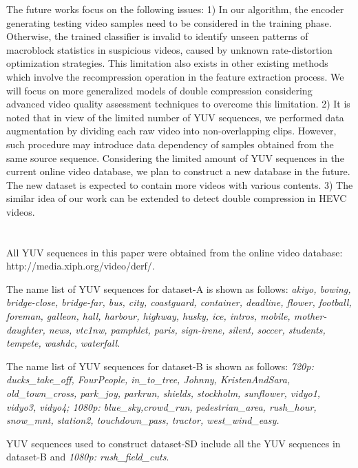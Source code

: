 \documentclass[journal,sort]{IEEEtran}
\begin{document}
The future works focus on the following issues: 1) In our algorithm, the encoder generating testing video samples need to be considered in the training phase. Otherwise, the trained classifier is invalid to identify unseen patterns of macroblock statistics in suspicious videos, caused by unknown rate-distortion optimization strategies. This limitation also exists in other existing methods which involve the recompression operation in the feature extraction process. We will focus on more generalized models of double compression considering advanced video quality assessment techniques to overcome this limitation. 2) It is noted that in view of the limited number of YUV sequences, we performed data augmentation by dividing each raw video into non-overlapping clips. However, such procedure may introduce data dependency of samples obtained from the same source sequence. Considering the limited amount of YUV sequences in the current online video database, we plan to construct a new database in the future. The new dataset is expected to contain more videos with various contents. 3) The similar idea of our work can be extended to detect double compression in HEVC videos.




\appendix

\section{}
All YUV sequences in this paper were obtained from the online video database: http://media.xiph.org/video/derf/.

The name list of YUV sequences for dataset-A is shown as follows: \emph{akiyo, bowing, bridge-close, bridge-far, bus, city, coastguard, container, deadline, flower, football, foreman, galleon, hall, harbour, highway, husky, ice, intros, mobile, mother-daughter, news, vtc1nw, pamphlet, paris, sign-irene, silent, soccer, students, tempete, washdc, waterfall}. 

The name list of YUV sequences for dataset-B is shown as follows: \emph{720p: ducks\_take\_off, FourPeople, in\_to\_tree, Johnny, KristenAndSara, old\_town\_cross, park\_joy, parkrun, shields, stockholm, sunflower, vidyo1, vidyo3, vidyo4; 1080p: blue\_sky,crowd\_run, pedestrian\_area, rush\_hour, snow\_mnt, station2, touchdown\_pass, tractor, west\_wind\_easy.}

YUV sequences used to construct dataset-SD include all the YUV sequences in dataset-B and \emph{1080p: rush\_field\_cuts}.
\end{document}
